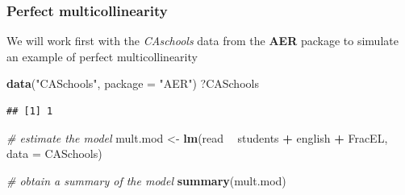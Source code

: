 \documentclass[]{book}
\newenvironment{Shaded}{\begin{snugshade}}{\end{snugshade}}
\newcommand{\CommentTok}[1]{\textcolor[rgb]{0.56,0.35,0.01}{\textit{#1}}}
\newcommand{\DataTypeTok}[1]{\textcolor[rgb]{0.13,0.29,0.53}{#1}}
\newcommand{\DecValTok}[1]{\textcolor[rgb]{0.00,0.00,0.81}{#1}}
\newcommand{\KeywordTok}[1]{\textcolor[rgb]{0.13,0.29,0.53}{\textbf{#1}}}
\newcommand{\NormalTok}[1]{#1}
\newcommand{\OperatorTok}[1]{\textcolor[rgb]{0.81,0.36,0.00}{\textbf{#1}}}
\newcommand{\StringTok}[1]{\textcolor[rgb]{0.31,0.60,0.02}{#1}}
\begin{document}
\hypertarget{perfect-multicollinearity}{%
\subsubsection{Perfect multicollinearity}\label{perfect-multicollinearity}}

We will work first with the \emph{CAschools} data from the \textbf{AER} package to simulate an example of perfect multicollinearity

\begin{Shaded}
\begin{Highlighting}[]
\KeywordTok{data}\NormalTok{(}\StringTok{"CASchools"}\NormalTok{, }\DataTypeTok{package =} \StringTok{"AER"}\NormalTok{)}
\NormalTok{?CASchools}
\end{Highlighting}
\end{Shaded}

\begin{Shaded}
\end{Shaded}

\begin{verbatim}
## [1] 1
\end{verbatim}

\begin{Shaded}
\begin{Highlighting}[]
\CommentTok{# estimate the model}
\NormalTok{mult.mod <-}\StringTok{ }\KeywordTok{lm}\NormalTok{(read }\OperatorTok{~}\StringTok{ }\NormalTok{students }\OperatorTok{+}\StringTok{ }\NormalTok{english }\OperatorTok{+}\StringTok{ }\NormalTok{FracEL, }\DataTypeTok{data =}\NormalTok{ CASchools) }

\CommentTok{# obtain a summary of the model}
\KeywordTok{summary}\NormalTok{(mult.mod)  }
\end{Highlighting}
\end{Shaded}
\end{document}

